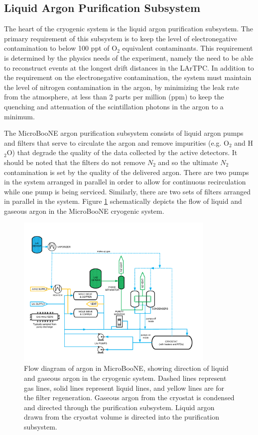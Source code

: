 \subsection{Liquid Argon Purification Subsystem}
\label{sec:purification}

The heart of the cryogenic system is the liquid argon purification subsystem.  The primary requirement of this subsystem is to keep the level of electronegative contamination to below 100 ppt of O$_2$ equivalent contaminants.  This requirement is determined by the physics needs of the experiment, namely the need to be able to reconstruct events at the longest drift distances in the LArTPC.  In addition to the requirement on the electronegative contamination, the system must maintain the level of nitrogen contamination in the argon, by minimizing the leak rate from the atmosphere, at less than 2 parts per million (ppm) \cite{Jones:2013bca} to keep the quenching and attenuation of the scintillation photons in the argon to a minimum.  

The MicroBooNE argon purification subsystem consists of liquid argon pumps and filters that serve to circulate the argon and remove impurities (e.g. O$_2$ and H$_2$O) that degrade the quality of the data collected by the active detectors.  It should be noted that the filters do not remove $N_2$ and so the ultimate $N_2$ contamination  is set by the quality of the delivered argon.  There are two pumps in the system arranged in parallel in order to allow for continuous recirculation while one pump is being serviced.  Similarly, there are two sets of filters arranged in parallel in the system.  Figure \ref{flowdiagram} schematically depicts the flow of liquid and gaseous argon in the MicroBooNE cryogenic system.

\begin{figure}
\centering 
\includegraphics[width=0.85\textwidth]{figures/cryo_flow.pdf}
\caption{Flow diagram of argon in MicroBooNE, showing direction of liquid and gaseous argon in the cryogenic system.  Dashed lines represent gas lines, solid lines represent liquid lines, and yellow lines are for the filter regeneration.  Gaseous argon from the cryostat is condensed and directed through the purification subsystem. Liquid argon drawn from the cryostat volume is directed into the purification subsystem.}
\label{flowdiagram}
\end{figure}


